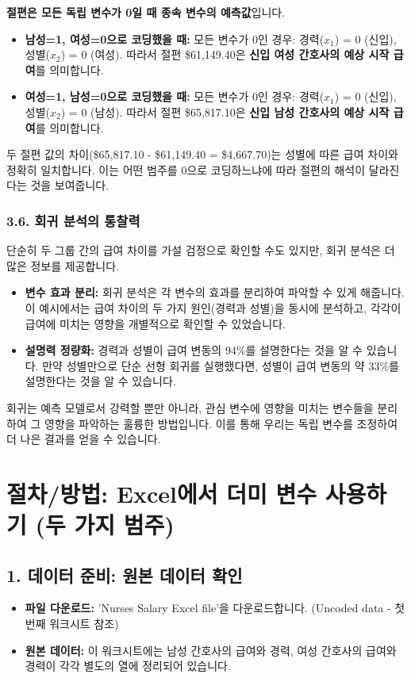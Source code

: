 \documentclass[11pt,a4paper]{book}
\theoremstyle{definition}
\begin{document}
\begin{tcolorbox}[title={절편(Intercept)의 의미 변화}]
\textbf{절편은 모든 독립 변수가 0일 때 종속 변수의 예측값}입니다.
\begin{itemize}
    \item \textbf{남성=1, 여성=0으로 코딩했을 때:}
    모든 변수가 0인 경우: 경력($x_1$) = 0 (신입), 성별($x_2$) = 0 (여성).
    따라서 절편 \$61,149.40은 \textbf{신입 여성 간호사의 예상 시작 급여}를 의미합니다.
    \item \textbf{여성=1, 남성=0으로 코딩했을 때:}
    모든 변수가 0인 경우: 경력($x_1$) = 0 (신입), 성별($x_2$) = 0 (남성).
    따라서 절편 \$65,817.10은 \textbf{신입 남성 간호사의 예상 시작 급여}를 의미합니다.
\end{itemize}
두 절편 값의 차이(\$65,817.10 - \$61,149.40 = \$4,667.70)는 성별에 따른 급여 차이와 정확히 일치합니다. 이는 어떤 범주를 0으로 코딩하느냐에 따라 절편의 해석이 달라진다는 것을 보여줍니다.
\end{tcolorbox}

\subsubsection*{3.6. 회귀 분석의 통찰력}
단순히 두 그룹 간의 급여 차이를 가설 검정으로 확인할 수도 있지만, 회귀 분석은 더 많은 정보를 제공합니다.
\begin{itemize}
    \item \textbf{변수 효과 분리:} 회귀 분석은 각 변수의 효과를 분리하여 파악할 수 있게 해줍니다. 이 예시에서는 급여 차이의 두 가지 원인(경력과 성별)을 동시에 분석하고, 각각이 급여에 미치는 영향을 개별적으로 확인할 수 있었습니다.
    \item \textbf{설명력 정량화:} 경력과 성별이 급여 변동의 94\%를 설명한다는 것을 알 수 있습니다. 만약 성별만으로 단순 선형 회귀를 실행했다면, 성별이 급여 변동의 약 33\%를 설명한다는 것을 알 수 있습니다.
\end{itemize}
회귀는 예측 모델로서 강력할 뿐만 아니라, 관심 변수에 영향을 미치는 변수들을 분리하여 그 영향을 파악하는 훌륭한 방법입니다. 이를 통해 우리는 독립 변수를 조정하여 더 나은 결과를 얻을 수 있습니다.


\section{절차/방법: Excel에서 더미 변수 사용하기 (두 가지 범주)}

\subsection{1. 데이터 준비: 원본 데이터 확인}
\begin{itemize}
    \item \textbf{파일 다운로드:} 'Nurses Salary Excel file'을 다운로드합니다. (Uncoded data - 첫 번째 워크시트 참조)
    \item \textbf{원본 데이터:} 이 워크시트에는 남성 간호사의 급여와 경력, 여성 간호사의 급여와 경력이 각각 별도의 열에 정리되어 있습니다.
\end{itemize}
\end{document}
